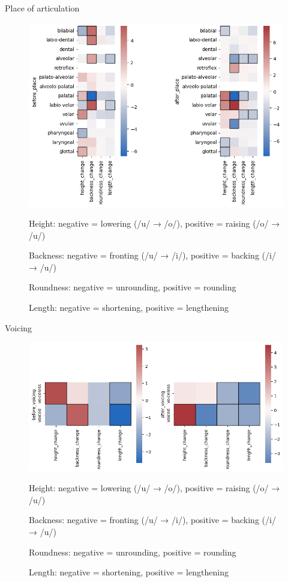 \documentclass[10pt]{beamer}
\begin{document}
  \begin{frame}{Place of articulation}
    \begin{figure}
      \centering
      \includegraphics[width=\textwidth, height=0.7\textheight, keepaspectratio]{place_change.png}
      
      \scriptsize Height: negative = lowering (/u/ → /o/), positive = raising (/o/ → /u/)
      
      \scriptsize Backness: negative = fronting (/u/ → /i/), positive = backing (/i/ → /u/)
      
      \scriptsize Roundness: negative = unrounding, positive = rounding
      
      \scriptsize Length: negative = shortening, positive = lengthening
    \end{figure}
  \end{frame}
  \begin{frame}{Voicing}
    \begin{figure}
      \centering
      \includegraphics[width=\textwidth, height=0.7\textheight, keepaspectratio]{voicing_change.png}
      
      \scriptsize Height: negative = lowering (/u/ → /o/), positive = raising (/o/ → /u/)
      
      \scriptsize Backness: negative = fronting (/u/ → /i/), positive = backing (/i/ → /u/)
      
      \scriptsize Roundness: negative = unrounding, positive = rounding
      
      \scriptsize Length: negative = shortening, positive = lengthening
    \end{figure}
  \end{frame}
\end{document}
